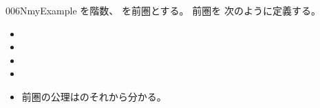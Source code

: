 \documentclass[index]{subfiles}
\begin{document}
\begin{myBlock}{006N}{myExample}
  を階数、
  を前圏とする。
  前圏を
  次のように定義する。
  \begin{itemize}
  \item {}
  \item {}
  \item {}
  \item {}
  \item 前圏の公理はのそれから分かる。
  \end{itemize}
\end{myBlock}
\end{document}
